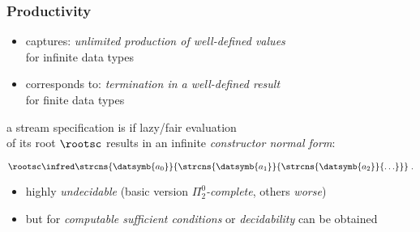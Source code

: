\documentclass[10pt]{beamer}
\begin{document}
\begin{frame}%
  \frametitle{Productivity}


\begin{itemize}
  \item 
    captures: \emph{unlimited production of well-defined values}\\
    for infinite data types
    \vspace*{1ex}
  \item corresponds to:
    \emph{termination in a well-defined result}\\
    for finite data types
  \end{itemize}
  \begin{definition}
      a stream specification  
      is 
      if lazy/fair evaluation\\
      of its root
      $\rootsc$ results in an infinite \emph{constructor normal form}:
      \begin{center}
        $
        \rootsc
        \infred
        \strcns{\datsymb{a_0}}{\strcns{\datsymb{a_1}}{\strcns{\datsymb{a_2}}{\ldots}}}
      \; .
        $
        \vspace*{-0.75ex}
      \end{center}
  \end{definition}
  \begin{itemize}
  \item  highly \emph{undecidable}
    (basic version \emph{$\Pi^0_2$-complete}, others \emph{worse}) 
    \vspace*{1ex}
  \item but for  
    \emph{computable sufficient conditions}
    or \emph{decidability} can be obtained
\end{itemize}
              
\end{frame}%
\end{document}
